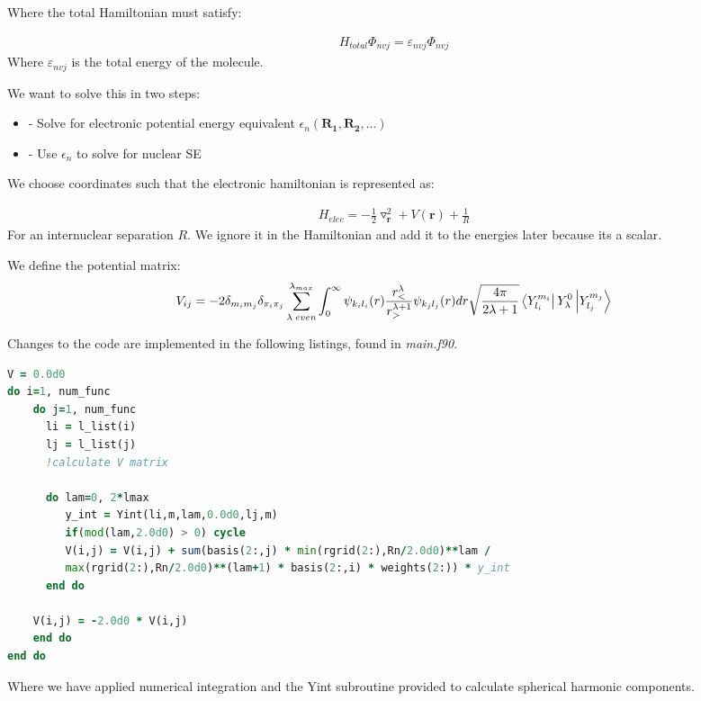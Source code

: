 \documentclass{article}
\renewcommand{\vec}[1]{\mathbf{#1}}
\begin{document}
    Where the total Hamiltonian must satisfy:
    
    \begin{gather}
    	H_{total}\Phi_{nvj} = \varepsilon_{nvj}\Phi_{nvj}
    \end{gather}
    Where $\varepsilon_{nvj}$ is the total energy of the molecule.
    
    We want to solve this in two steps:
    \begin{itemize}
    	\item - Solve for electronic potential energy equivalent $\epsilon_n(\vec{R_1},\vec{R_2},...)$
    	\item - Use $\epsilon_n$ to solve for nuclear SE
    \end{itemize}
    
    We choose coordinates such that the electronic hamiltonian is represented as:
    
    \begin{gather}
    	H_{elec} = -\frac{1}{2}\triangledown^2_\vec{r} + V(\vec{r}) + \frac{1}{R}
    \end{gather}
    For an internuclear separation $R$. We ignore it in the Hamiltonian and add it to the energies later because its a scalar.
    
    We define the potential matrix:
    \begin{gather}
    	V_{ij} = -2\delta_{m_i m_j} \delta_{\pi_i \pi_j} \sum_{\lambda\;even}^{\lambda_{max}} \int_{0}^{\infty} \psi_{k_i l_i}(r) \frac{r_{<}^{\lambda}}{r_{>}^{\lambda+1}} \psi_{k_j l_j}(r) dr \sqrt{\frac{4\pi}{2\lambda+1}} \bra{Y^{m_i}_{l_i}}Y_{\lambda}^0\ket{Y^{m_j}_{l_j}}
    \end{gather}
    
    Changes to the code are implemented in the following listings, found in \textit{main.f90}.
    
\begin{lstlisting}[language=fortran]
V = 0.0d0
do i=1, num_func
	do j=1, num_func
	  li = l_list(i)
	  lj = l_list(j)
	  !calculate V matrix
	   	
	  do lam=0, 2*lmax
	   	 y_int = Yint(li,m,lam,0.0d0,lj,m)
		 if(mod(lam,2.0d0) > 0) cycle 
		 V(i,j) = V(i,j) + sum(basis(2:,j) * min(rgrid(2:),Rn/2.0d0)**lam / 
		 max(rgrid(2:),Rn/2.0d0)**(lam+1) * basis(2:,i) * weights(2:)) * y_int       
	  end do
	   	
	V(i,j) = -2.0d0 * V(i,j)
	end do
end do
\end{lstlisting}

Where we have applied numerical integration and the Yint subroutine provided to calculate spherical harmonic components.
\end{document}

